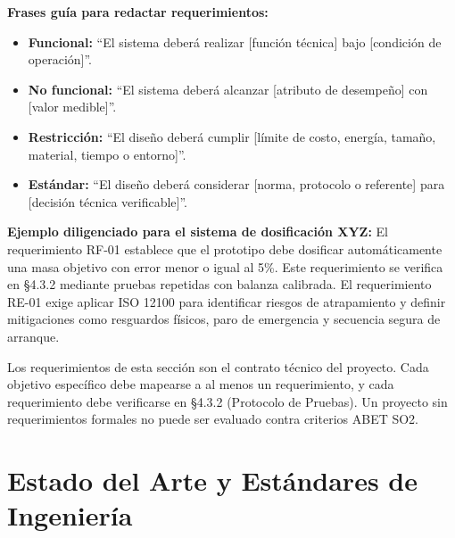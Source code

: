\documentclass[12pt,letterpaper]{report}
\begin{document}
\begin{instrucciones}
\vspace{2mm}
\noindent \textbf{Frases guía para redactar requerimientos:}
\begin{itemize}
  \item \textbf{Funcional:} ``El sistema deberá realizar [función técnica] bajo [condición de operación]''.
  \item \textbf{No funcional:} ``El sistema deberá alcanzar [atributo de desempeño] con [valor medible]''.
  \item \textbf{Restricción:} ``El diseño deberá cumplir [límite de costo, energía, tamaño, material, tiempo o entorno]''.
  \item \textbf{Estándar:} ``El diseño deberá considerar [norma, protocolo o referente] para [decisión técnica verificable]''.
\end{itemize}

\vspace{2mm}
\noindent \textbf{Ejemplo diligenciado para el sistema de dosificación XYZ:} El requerimiento RF-01 establece que el prototipo debe dosificar automáticamente una masa objetivo con error menor o igual al 5\%. Este requerimiento se verifica en \S4.3.2 mediante pruebas repetidas con balanza calibrada. El requerimiento RE-01 exige aplicar ISO 12100 para identificar riesgos de atrapamiento y definir mitigaciones como resguardos físicos, paro de emergencia y secuencia segura de arranque.

\begin{advertenciaABET}
Los requerimientos de esta sección son el contrato técnico del proyecto. Cada objetivo específico debe mapearse a al menos un requerimiento, y cada requerimiento debe verificarse en \S4.3.2 (Protocolo de Pruebas). Un proyecto sin requerimientos formales no puede ser evaluado contra criterios ABET SO2.
\end{advertenciaABET}
\end{instrucciones}

\chapter{Estado del Arte y Estándares de Ingeniería}
\end{document}
